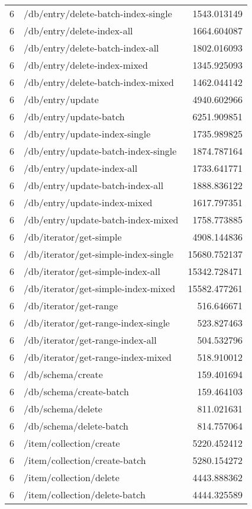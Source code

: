 \begin{longtable}{rlr}
6 & /db/entry/delete-batch-index-single & 1543.013149 \\
6 & /db/entry/delete-index-all & 1664.604087 \\
6 & /db/entry/delete-batch-index-all & 1802.016093 \\
6 & /db/entry/delete-index-mixed & 1345.925093 \\
6 & /db/entry/delete-batch-index-mixed & 1462.044142 \\
6 & /db/entry/update & 4940.602966 \\
6 & /db/entry/update-batch & 6251.909851 \\
6 & /db/entry/update-index-single & 1735.989825 \\
6 & /db/entry/update-batch-index-single & 1874.787164 \\
6 & /db/entry/update-index-all & 1733.641771 \\
6 & /db/entry/update-batch-index-all & 1888.836122 \\
6 & /db/entry/update-index-mixed & 1617.797351 \\
6 & /db/entry/update-batch-index-mixed & 1758.773885 \\
6 & /db/iterator/get-simple & 4908.144836 \\
6 & /db/iterator/get-simple-index-single & 15680.752137 \\
6 & /db/iterator/get-simple-index-all & 15342.728471 \\
6 & /db/iterator/get-simple-index-mixed & 15582.477261 \\
6 & /db/iterator/get-range & 516.646671 \\
6 & /db/iterator/get-range-index-single & 523.827463 \\
6 & /db/iterator/get-range-index-all & 504.532796 \\
6 & /db/iterator/get-range-index-mixed & 518.910012 \\
6 & /db/schema/create & 159.401694 \\
6 & /db/schema/create-batch & 159.464103 \\
6 & /db/schema/delete & 811.021631 \\
6 & /db/schema/delete-batch & 814.757064 \\
6 & /item/collection/create & 5220.452412 \\
6 & /item/collection/create-batch & 5280.154272 \\
6 & /item/collection/delete & 4443.888362 \\
6 & /item/collection/delete-batch & 4444.325589 \\

\end{longtable}
